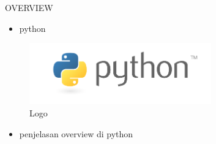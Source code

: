 
\sloppy
\begin{center}{\fontsize{14pt}{14pt}\selectfont OVERVIEW \\}\end{center} \par

\begin{itemize}
	\item python
\end{itemize}
\begin{figure}[ht]
	\centerline{\includegraphics[width=0.70\textwidth]{figures/python}}
	\caption{Logo}
	\label{Logooverview}
\end{figure}

\begin{itemize}
	\item penjelasan overview di python
\end{itemize}


